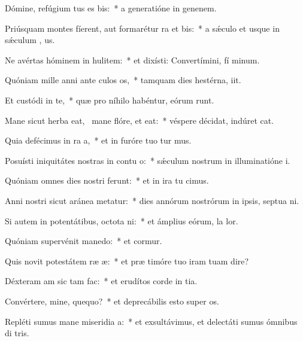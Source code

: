 \item Dómine, refúgium tus es bis:~* a generatióne in genenem.
\item Priúsquam montes fíerent, aut formarétur ra et bis:~* a sǽculo et usque in sǽculum  , us.
\item Ne avértas hóminem in hulitem:~* et dixísti: Convertímini, fí minum.
\item Quóniam mille anni ante culos os,~* tamquam dies hestérna,  iit.
\item Et custódi in te,~* quæ pro níhilo habéntur, eórum  runt.
\item Mane sicut herba eat,~\pscross{} mane flóre, et eat:~* véspere décidat, indúret  cat.
\item Quia defécimus in ra a,~* et in furóre tuo tur mus.
\item Posuísti iniquitátes nostras in contu o:~* sǽculum nostrum in illuminatióne  i.
\item Quóniam omnes dies nostri ferunt:~* et in ira tu cimus.
\item Anni nostri sicut aránea metatur:~* dies annórum nostrórum in ipsis, septua ni.
\item Si autem in potentátibus, octota ni:~* et ámplius eórum, la  lor.
\item Quóniam supervénit manedo:~* et cormur.
\item Quis novit potestátem ræ æ:~* et præ timóre tuo iram tuam dire?
\item Déxteram am sic tam fac:~* et erudítos corde in tia.
\item Convértere, mine, quequo?~* et deprecábilis esto super  os.
\item Repléti sumus mane miseridia a:~* et exsultávimus, et delectáti sumus ómnibus di tris.
